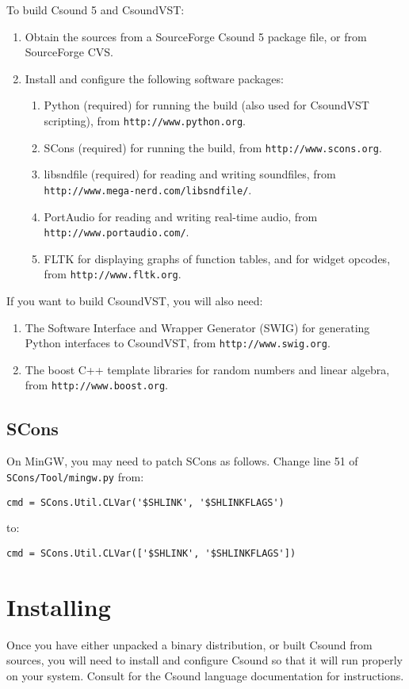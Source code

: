 \documentclass[10pt,letterpaper,onecolumn]{article}
\begin{document}
To build Csound 5 and CsoundVST:
\begin{enumerate}
\item Obtain the sources from a SourceForge Csound 5 package file, or from SourceForge CVS.
\item Install and configure the following software packages:
\begin{enumerate}
\item Python (required) for running the build (also used for CsoundVST scripting), from \texttt{http:\-//www.python.org}.
\item SCons (required) for running the build, from \texttt{http:\-//www.scons.org}.
\item libsndfile (required) for reading and writing soundfiles, from \texttt{http://www.mega-nerd.com/libsndfile/}.
\item PortAudio for reading and writing real-time audio, from \texttt{http://www.portaudio.com/}.
\item FLTK for displaying graphs of function tables, and for widget opcodes, from \texttt{http://www.fltk.org}.
\end{enumerate}
\end{enumerate}
\item If you want to build CsoundVST, you will also need:

\begin{enumerate}
\item The Software Interface and Wrapper Generator (SWIG) for generating Python interfaces to CsoundVST, from \texttt{http://www.swig.org}.
\item The boost C++ template libraries for random numbers and linear algebra, from \texttt{http://www.boost.org}.
\end{enumerate}
\subsection{SCons}
On MinGW, you may need to patch SCons as follows. Change line 51 of \texttt{SCons/Tool/mingw.py} from:
\begin{verbatim}
cmd = SCons.Util.CLVar('$SHLINK', '$SHLINKFLAGS')
\end{verbatim}
to:
\begin{verbatim}
cmd = SCons.Util.CLVar(['$SHLINK', '$SHLINKFLAGS']) 
\end{verbatim}
\section{Installing}
Once you have either unpacked a binary distribution, or built Csound from sources, you will need to install and configure Csound so that it will run properly on your system. Consult for the Csound language documentation for instructions.
\end{document}
